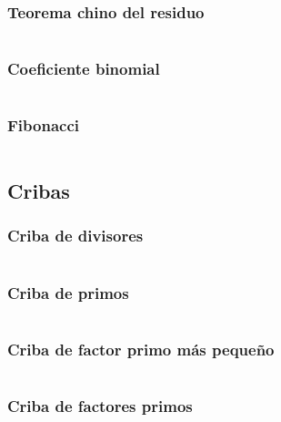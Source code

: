 \documentclass[11pt]{article}
\begin{document}
			\subsubsection{Teorema chino del residuo}
			\inputminted[tabsize=2,breaklines,firstline=108,lastline=117,fontsize=\small]{c++}{numberTheory.cpp}
			
			\subsubsection{Coeficiente binomial}
			\inputminted[tabsize=2,breaklines,firstline=433,lastline=440,fontsize=\small]{c++}{numberTheory.cpp}
			
			\subsubsection{Fibonacci}
			\inputminted[tabsize=2,breaklines,firstline=720,lastline=741,fontsize=\small]{c++}{numberTheory.cpp}
		
		\subsection{Cribas}
			\subsubsection{Criba de divisores}
			\inputminted[tabsize=2,breaklines,firstline=119,lastline=130,fontsize=\small]{c++}{numberTheory.cpp}
			
			\subsubsection{Criba de primos}
			\inputminted[tabsize=2,breaklines,firstline=132,lastline=148,fontsize=\small]{c++}{numberTheory.cpp}
			
			\subsubsection{Criba de factor primo más pequeño}
			\inputminted[tabsize=2,breaklines,firstline=150,lastline=160,fontsize=\small]{c++}{numberTheory.cpp}
			
			\subsubsection{Criba de factores primos}
			\inputminted[tabsize=2,breaklines,firstline=162,lastline=170,fontsize=\small]{c++}{numberTheory.cpp}
			
\end{document}
